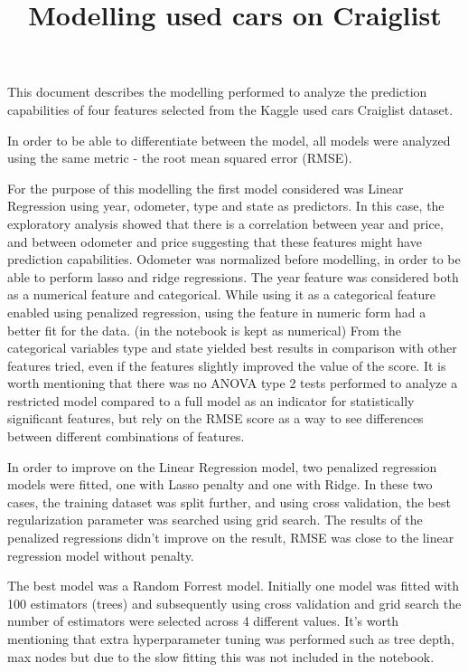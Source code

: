 \documentclass[11pt,a4paper]{article}
\date{}
\title{Modelling used cars on Craiglist}
\begin{document}
\newpage
\maketitle

This document describes the modelling performed to analyze the prediction capabilities of four features selected from the Kaggle used cars Craiglist dataset. 

In order to be able to differentiate between the model, all models were analyzed using the same metric - the root mean squared error (RMSE).

For the purpose of this modelling the first model considered was Linear Regression using year, odometer, type and state as predictors. In this case, the exploratory analysis showed that there is a correlation between year and price, and between odometer and price suggesting that these features might have prediction capabilities. Odometer was normalized before modelling, in order to be able to perform lasso and ridge regressions. The year feature was considered both as a numerical feature and categorical. While using it as a categorical feature enabled using penalized regression, using the feature in numeric form had a better fit for the data. (in the notebook is kept as numerical) From the categorical variables type and state yielded best results in comparison with other features tried, even if the features slightly improved the value of the score. It is worth mentioning that there was no ANOVA type 2 tests performed to analyze a restricted model compared to a full model as an indicator for statistically significant features, but rely on the RMSE score as a way to see differences between different combinations of features.

In order to improve on the Linear Regression model, two penalized regression models were fitted, one with Lasso penalty and one with Ridge. In these two cases, the training dataset was split further, and using cross validation, the best regularization parameter was searched using grid search. The results of the penalized regressions didn't improve on the result, RMSE was close to the linear regression model without penalty. 

The best model was a Random Forrest model. Initially one model was fitted with 100 estimators (trees) and subsequently using cross validation and grid search the number of estimators were selected across 4 different values. It's worth mentioning that extra hyperparameter tuning was performed such as tree depth, max nodes but due to the slow fitting this was not included in the notebook. 
 
\end{document}
